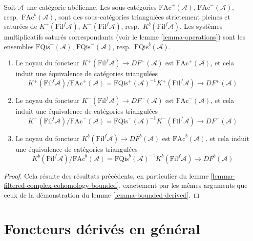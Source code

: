 \begin{lemma}
\label{lemma-filtered-bounded-derived}
Soit $\mathcal{A}$ une catégorie abélienne. Les sous-catégories
$\text{FAc}^{+}(\mathcal{A})$, $\text{FAc}^{-}(\mathcal{A})$, resp.\
$\text{FAc}^b(\mathcal{A})$, sont des sous-catégories triangulées strictement
pleines et saturées de $K^{+}(\text{Fil}^f\mathcal{A})$,
$K^{-}(\text{Fil}^f\mathcal{A})$, resp.\ $K^b(\text{Fil}^f\mathcal{A})$.
Les systèmes multiplicatifs saturés correspondants (voir le
lemme \ref{lemma-operations}) sont les ensembles
$\text{FQis}^{+}(\mathcal{A})$, $\text{FQis}^{-}(\mathcal{A})$, resp.\
$\text{FQis}^b(\mathcal{A})$.
\begin{enumerate}
\item Le noyau du foncteur
$K^{+}(\text{Fil}^f\mathcal{A}) \to DF^{+}(\mathcal{A})$ est
$\text{FAc}^{+}(\mathcal{A})$, et cela induit une équivalence de catégories
triangulées
$$
K^{+}(\text{Fil}^f\mathcal{A})/\text{FAc}^{+}(\mathcal{A}) =
\text{FQis}^{+}(\mathcal{A})^{-1}K^{+}(\text{Fil}^f\mathcal{A})
\longrightarrow
DF^{+}(\mathcal{A})
$$
\item Le noyau du foncteur
$K^{-}(\text{Fil}^f\mathcal{A}) \to DF^{-}(\mathcal{A})$ est
$\text{FAc}^{-}(\mathcal{A})$, et cela induit une équivalence de catégories
triangulées
$$
K^{-}(\text{Fil}^f\mathcal{A})/\text{FAc}^{-}(\mathcal{A}) =
\text{FQis}^{-}(\mathcal{A})^{-1}K^{-}(\text{Fil}^f\mathcal{A})
\longrightarrow
DF^{-}(\mathcal{A})
$$
\item Le noyau du foncteur
$K^b(\text{Fil}^f\mathcal{A}) \to DF^b(\mathcal{A})$ est
$\text{FAc}^b(\mathcal{A})$, et cela induit une équivalence de catégories
triangulées
$$
K^b(\text{Fil}^f\mathcal{A})/\text{FAc}^b(\mathcal{A}) =
\text{FQis}^b(\mathcal{A})^{-1}K^b(\text{Fil}^f\mathcal{A})
\longrightarrow
DF^b(\mathcal{A})
$$
\end{enumerate}
\end{lemma}

\begin{proof}
Cela résulte des résultats précédents, en particulier du
lemme \ref{lemma-filtered-complex-cohomology-bounded}, exactement par les mêmes
arguments que ceux de la démonstration du lemme \ref{lemma-bounded-derived}.
\end{proof}











\section{Foncteurs dérivés en général}
\label{section-derived-functors}

